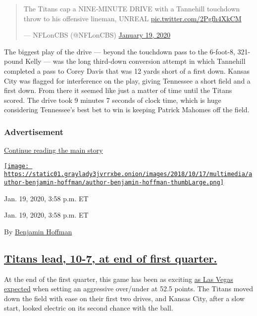 \begin{quote}
The Titans cap a NINE-MINUTE DRIVE with a Tannehill touchdown throw to
his offensive lineman, UNREAL
\href{https://t.co/2Pgfh4XkCM}{pic.twitter.com/2Pgfh4XkCM}

--- NFLonCBS (@NFLonCBS)
\href{https://twitter.com/NFLonCBS/status/1219003200189059072?ref_src=twsrc\%5Etfw}{January
19, 2020}
\end{quote}

The biggest play of the drive --- beyond the touchdown pass to the
6-foot-8, 321-pound Kelly --- was the long third-down conversion attempt
in which Tannehill completed a pass to Corey Davis that was 12 yards
short of a first down. Kansas City was flagged for interference on the
play, giving Tennessee a short field and a first down. From there it
seemed like just a matter of time until the Titans scored. The drive
took 9 minutes 7 seconds of clock time, which is huge considering
Tennessee's best bet to win is keeping Patrick Mahomes off the field.

\hypertarget{advertisement-4}{%
\subsubsection{Advertisement}\label{advertisement-4}}

\protect\hyperlink{after-dfp-ad-mid5}{Continue reading the main story}

\href{https://www.nytimes3xbfgragh.onion/by/benjamin-hoffman}{\texttt{[image: https://static01.graylady3jvrrxbe.onion/images/2018/10/17/multimedia/author-benjamin-hoffman/author-benjamin-hoffman-thumbLarge.png]}}

Jan. 19, 2020, 3:58 p.m. ET

Jan. 19, 2020, 3:58 p.m. ET

By
\href{https://www.nytimes3xbfgragh.onion/by/benjamin-hoffman}{Benjamin
Hoffman}

\hypertarget{titans-lead-10-7-at-end-of-first-quarter}{%
\subsection{\texorpdfstring{\protect\hyperlink{titans-lead-10-7-at-end-of-first-quarter}{Titans
lead, 10-7, at end of first
quarter.}}{Titans lead, 10-7, at end of first quarter.}}\label{titans-lead-10-7-at-end-of-first-quarter}}

At the end of the first quarter, this game has been as exciting
\href{https://www.nytimes3xbfgragh.onion/2020/01/17/sports/football/nfl-playoffs-conference-picks.html}{as
Las Vegas expected} when setting an aggressive over/under at 52.5
points. The Titans moved down the field with ease on their first two
drives, and Kansas City, after a slow start, looked electric on its
second chance with the ball.

